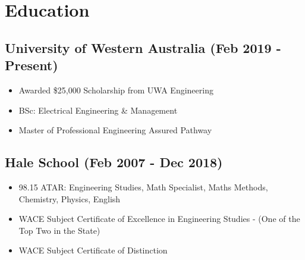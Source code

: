 \documentclass{article}[a4page]
\begin{document}
\section*{Education}
\subsection*{University of Western Australia \hfill (Feb 2019 - Present)}
\begin{itemize}
\item Awarded \$25,000 Scholarship from UWA Engineering
\item BSc: Electrical Engineering \& Management
\item Master of Professional Engineering Assured Pathway
\end{itemize}

\subsection*{Hale School \hfill (Feb 2007 - Dec 2018)}
\begin{itemize}
\item 98.15 ATAR: Engineering Studies, Math Specialist, Maths Methods, Chemistry, Physics, English
\item WACE Subject Certificate of Excellence in Engineering Studies - (One of the Top Two in the State)
\item WACE Subject Certificate of Distinction
\end{itemize}
\end{document}
